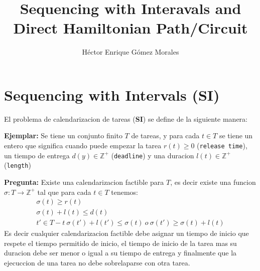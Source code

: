 \documentclass{article}
\author{Héctor Enrique Gómez Morales}
\title{Sequencing with Interavals and Direct Hamiltonian Path/Circuit}
\begin{document}
\maketitle
\section{Sequencing with Intervals (SI)}
El problema de calendarizacion de tareas (\textbf{SI}) se define de la siguiente manera:

\textbf{Ejemplar:} Se tiene un conjunto finito $T$ de tareas, y para cada $t \in T$
se tiene un entero que significa cuando puede empezar la tarea $r(t) \geq 0$ (\texttt{release time}), un tiempo de entrega $d(y) \in \mathbb{Z}^{+}$ (\texttt{deadline}) y una duracion $l(t) \in \mathbb{Z}^{+}$ (\texttt{length})

\textbf{Pregunta:} Existe una calendarizacion factible para $T$, es decir existe una funcion $\sigma : T \rightarrow \mathbb{Z}^{+}$ tal que para cada $t \in T$ tenemos:
\begin{equation*}
  \begin{split}
    \sigma(t) \geq r(t)\\
    \sigma(t) + l(t) \leqslant d(t)\\
    t' \in T - {t}\ \sigma(t') + l(t') \leqslant \sigma(t)\ o\ \sigma(t') \geq \sigma(t) + l(t)
  \end{split}
\end{equation*}
Es decir cualquier calendarizacion factible debe asignar un tiempo de inicio que respete el tiempo permitido de inicio, el tiempo de inicio de la tarea mas su duracion debe ser menor o igual a su tiempo de entrega y finalmente que la ejecuccion de una tarea no debe sobrelaparse con otra tarea.
\end{document}
